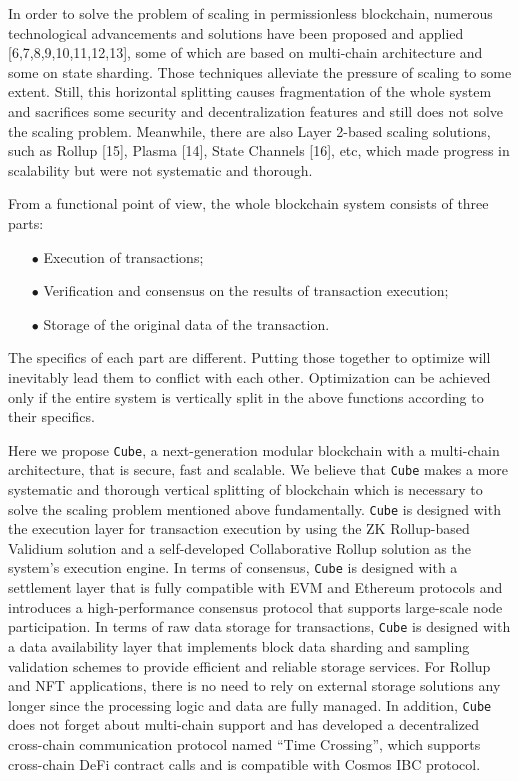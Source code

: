 \documentclass{iacrtrans}
\begin{document}
In order to solve the problem of scaling in permissionless blockchain, numerous technological advancements and solutions have been proposed and applied [6,7,8,9,10,11,12,13], some of which are based on multi-chain architecture and some on state sharding. Those techniques alleviate the pressure of scaling to some extent. Still, this horizontal splitting causes fragmentation of the whole system and sacrifices some security and decentralization features and still does not solve the scaling problem. Meanwhile, there are also Layer 2-based scaling solutions, such as Rollup [15], Plasma [14], State Channels [16], etc, which made progress in scalability but were not systematic and thorough.

From a functional point of view, the whole blockchain system consists of three parts:
\begin{itemize}
	\item[$\bullet$] Execution of transactions;
	\item[$\bullet$] Verification and consensus on the results of transaction execution;
	\item[$\bullet$] Storage of the original data of the transaction.
\end{itemize}

The specifics of each part are different. Putting those together to optimize will inevitably lead them to conflict with each other. Optimization can be achieved only if the entire system is vertically split in the above functions according to their specifics.

Here we propose \texttt{Cube}, a next-generation modular blockchain with a multi-chain architecture, that is secure, fast and scalable. We believe that \texttt{Cube} makes a more systematic and thorough vertical splitting of blockchain which is necessary to solve the scaling problem mentioned above fundamentally. \texttt{Cube} is designed with the execution layer for transaction execution by using the ZK Rollup-based Validium solution and a self-developed Collaborative Rollup solution as the system's execution engine. In terms of consensus, \texttt{Cube} is designed with a settlement layer that is fully compatible with EVM and Ethereum protocols and introduces a high-performance consensus protocol that supports large-scale node participation. In terms of raw data storage for transactions, \texttt{Cube} is designed with a data availability layer that implements block data sharding and sampling validation schemes to provide efficient and reliable storage services. For Rollup and NFT applications, there is no need to rely on external storage solutions any longer since the processing logic and data are fully managed. In addition, \texttt{Cube} does not forget about multi-chain support and has developed a decentralized cross-chain communication protocol named “Time Crossing”, which supports cross-chain DeFi contract calls and is compatible with Cosmos IBC protocol.
\end{document}
